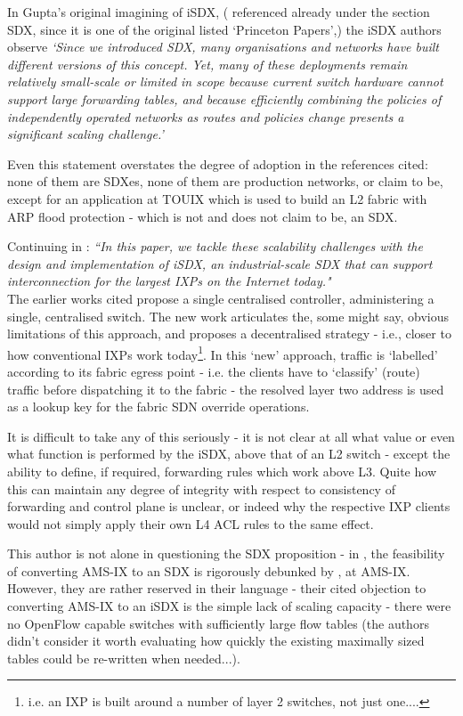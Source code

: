 \smallskip


In Gupta's original imagining of iSDX\cite{Gupta2016}, ( referenced already under the section SDX, since it is one of the original listed `Princeton Papers',)  the iSDX authors observe \emph{`Since we introduced SDX, many organisations and networks have built different versions of this concept. Yet, many of these deployments remain relatively small-scale or limited in scope because current switch hardware cannot support large forwarding tables, and because efficiently combining the policies of independently operated networks as routes and policies change presents a significant scaling challenge.'}


Even this statement overstates the degree of adoption in the references cited: none of them are SDXes, none of them are production networks, or claim to be, except for an application at TOUIX which is used to build an L2 fabric with ARP flood protection - which is not and does not claim to be, an SDX.



Continuing in \cite{Gupta2016}: 
\emph{``In this paper, we tackle these scalability challenges with the design and implementation of iSDX, an industrial-scale SDX that can support interconnection for the largest IXPs on the Internet today."} \\
The earlier works cited propose a single centralised controller, administering a single, centralised switch.
The new work articulates the, some might say, obvious limitations of this approach, and proposes a decentralised strategy - i.e., closer to how conventional IXPs work today\footnote{i.e. an IXP is built around a number of layer 2 switches, not just one....}.
In this `new' approach, traffic is `labelled' according to its fabric egress point - i.e. the clients have to `classify' (route) traffic before dispatching it to the fabric - the resolved layer two address is used as a lookup key for the fabric SDN override operations.


It is difficult to take any of this seriously - it is not clear at all what value or even what function is performed by the iSDX, above that of an L2 switch - except the ability to define, if required, forwarding rules which work above L3.
Quite how this can maintain any degree of integrity with respect to consistency of forwarding and control plane is unclear, or indeed why the respective IXP clients would not simply apply their own L4 ACL rules to the same effect.


This author is not alone in questioning the SDX proposition - in \cite{hermans2016}, the feasibility of converting AMS-IX to an SDX is rigorously debunked by  \citeauthor{hermans2016}, at AMS-IX.  However, they are rather reserved in their language - their cited objection to converting AMS-IX to an iSDX is the simple lack of scaling capacity - there were no OpenFlow capable switches with sufficiently large flow tables (the authors didn't consider it worth evaluating how quickly the existing 
 maximally sized tables could be re-written when needed...).  


